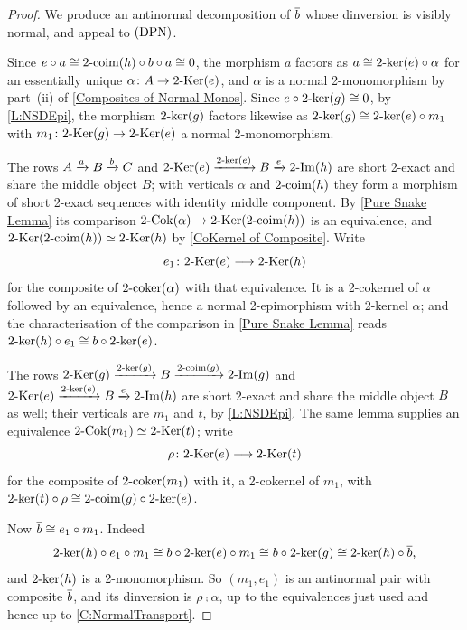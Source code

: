 \begin{proof}
  \leanok
  We produce an antinormal decomposition of \(\overline{b}\) whose dinversion is visibly normal, and appeal to \(\textup{(DPN)}\).

	Since \(e\circ a\cong2\text{-}\mathrm{coim}(h)\circ b\circ a\cong 0\), the morphism \(a\) factors as \(a\cong2\text{-}\mathrm{ker}(e)\circ\alpha\) for an essentially unique \(\alpha\colon A\to2\text{-}\mathrm{Ker}(e)\), and \(\alpha\) is a normal 2-monomorphism by part~\textup{(ii)} of \prox\ref{Composites of Normal Monos}. Since \(e\circ2\text{-}\mathrm{ker}(g)\cong 0\), by \lemx\ref{L:NSDEpi}, the morphism \(2\text{-}\mathrm{ker}(g)\) factors likewise as \(2\text{-}\mathrm{ker}(g)\cong2\text{-}\mathrm{ker}(e)\circ m_1\) with \(m_1\colon2\text{-}\mathrm{Ker}(g)\to2\text{-}\mathrm{Ker}(e)\) a normal 2-monomorphism.

	The rows \(A\xrightarrow[]{a}B\xrightarrow[]{b}C\) and \(2\text{-}\mathrm{Ker}(e)\xrightarrow[]{2\text{-}\mathrm{ker}(e)}B\xrightarrow[]{e}2\text{-}\mathrm{Im}(h)\) are short 2-exact and share the middle object \(B\); with verticals \(\alpha\) and \(2\text{-}\mathrm{coim}(h)\) they form a morphism of short 2-exact sequences with identity middle component. By \lemx\ref{Pure Snake Lemma} its comparison \(2\text{-}\mathrm{Cok}(\alpha)\to2\text{-}\mathrm{Ker}(2\text{-}\mathrm{coim}(h))\) is an equivalence, and \(2\text{-}\mathrm{Ker}(2\text{-}\mathrm{coim}(h))\simeq2\text{-}\mathrm{Ker}(h)\) by \prox\ref{CoKernel of Composite}. Write
	\[
		e_1\colon2\text{-}\mathrm{Ker}(e)\longrightarrow2\text{-}\mathrm{Ker}(h)
	\]
	for the composite of \(2\text{-}\mathrm{coker}(\alpha)\) with that equivalence. It is a 2-cokernel of \(\alpha\) followed by an equivalence, hence a normal 2-epimorphism with 2-kernel \(\alpha\); and the characterisation of the comparison in \lemx\ref{Pure Snake Lemma} reads \(2\text{-}\mathrm{ker}(h)\circ e_1\cong b\circ2\text{-}\mathrm{ker}(e)\).

	The rows \(2\text{-}\mathrm{Ker}(g)\xrightarrow[]{2\text{-}\mathrm{ker}(g)}B\xrightarrow[]{2\text{-}\mathrm{coim}(g)}2\text{-}\mathrm{Im}(g)\) and \(2\text{-}\mathrm{Ker}(e)\xrightarrow[]{2\text{-}\mathrm{ker}(e)}B\xrightarrow[]{e}2\text{-}\mathrm{Im}(h)\) are short 2-exact and share the middle object \(B\) as well; their verticals are \(m_1\) and \(t\), by \lemx\ref{L:NSDEpi}. The same lemma supplies an equivalence \(2\text{-}\mathrm{Cok}(m_1)\simeq2\text{-}\mathrm{Ker}(t)\); write
	\[
		\rho\colon2\text{-}\mathrm{Ker}(e)\longrightarrow2\text{-}\mathrm{Ker}(t)
	\]
	for the composite of \(2\text{-}\mathrm{coker}(m_1)\) with it, a 2-cokernel of \(m_1\), with \(2\text{-}\mathrm{ker}(t)\circ\rho\cong2\text{-}\mathrm{coim}(g)\circ2\text{-}\mathrm{ker}(e)\).

	Now \(\overline{b}\cong e_1\circ m_1\). Indeed
	\[
		2\text{-}\mathrm{ker}(h)\circ e_1\circ m_1\cong b\circ2\text{-}\mathrm{ker}(e)\circ m_1\cong b\circ2\text{-}\mathrm{ker}(g)\cong2\text{-}\mathrm{ker}(h)\circ\overline{b}\text{,}
	\]
	and \(2\text{-}\mathrm{ker}(h)\) is a 2-monomorphism. So \((m_1,e_1)\) is an antinormal pair with composite \(\overline{b}\), and its dinversion is \(\rho\comp\alpha\), up to the equivalences just used and hence up to \corx\ref{C:NormalTransport}.


\end{proof}
